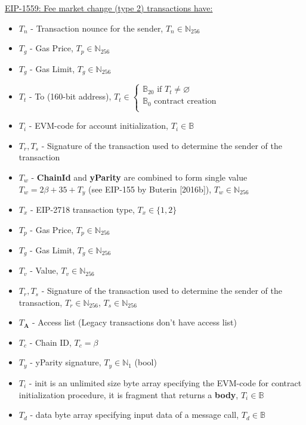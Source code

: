 \documentclass{article}
\begin{document}
\begin{itemize}
    \underline{EIP-1559: Fee market change (type 2) transactions have:}
    \begin{itemize}
        \item $T_n$ - Transaction nounce for the sender, $T_n \in \mathbb{N}_{256}$
        \item $T_g$ - Gas Price, $T_p \in \mathbb{N}_{256}$
        \item $T_g$ - Gas Limit, $T_g \in \mathbb{N}_{256}$
        \item $T_t$ - To (160-bit address),  $T_t \in \left\{
            \begin{array}{ll}
                      \mathbb{B}_{20} \text{ if } T_t \neq \varnothing \\
                      \mathbb{B}_{0} \text{ contract creation}\\
                    \end{array}
                  \right.
            $
        \item $T_i$ - EVM-code for account initialization, $T_i \in \mathbb{B}$
        \item $T_r, T_s$ - Signature of the transaction used to determine the sender of the transaction
        \item $T_w$ - \textbf{ChainId} and \textbf{yParity} are combined to form single value $T_w = 2\beta + 35 + T_y$ (see EIP-155 by Buterin [2016b]), $T_w \in \mathbb{N}_{256}$
        \item $T_x$ - EIP-2718 transaction type, $T_x \in \{1,2\}$
        \item $T_p$ - Gas Price, $T_p \in \mathbb{N}_{256}$
        \item $T_g$ - Gas Limit, $T_g \in \mathbb{N}_{256}$
        \item $T_v$ - Value, $T_v \in \mathbb{N}_{256}$
        \item $T_r, T_s$ - Signature of the transaction used to determine the sender of the transaction, $T_r \in \mathbb{N}_{256}$, $T_s \in \mathbb{N}_{256}$
        \item $T\bm{_A}$ - Access list (Legacy transactions don't have access list)
        \item $T_c$ - Chain ID, $T_c = \beta$
        \item $T_y$ - yParity signature, $T_y \in \mathbb{N}_{1}$ (bool)
        \item $T_i$ - init is an unlimited size byte array specifying the EVM-code for contract initialization procedure, it is fragment that returns a \textbf{body}, $T_i \in \mathbb{B}$
        \item $T_d$ - data byte array specifying input data of a message call, $T_d \in \mathbb{B}$


\end{itemize}
\end{itemize}
\end{document}
